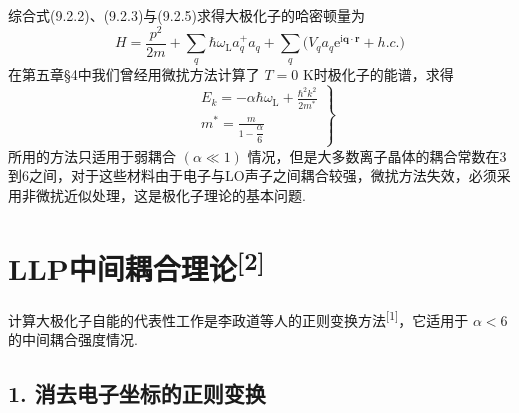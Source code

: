 综合式(9.2.2)、(9.2.3)与(9.2.5)求得大极化子的哈密顿量为
\begin{equation}
  H=\frac{p^{2}}{2m}+\sum_{q}\hbar\omega_{\mathrm L}a_{q}^{+}a_{q}
  +\sum_{q}\bigl(V_{q}a_{q}\mathrm{e}^{\mathrm{i}\boldsymbol{q}\cdot\boldsymbol{r}}+h.c.\bigr)
\end{equation}
在第五章§4中我们曾经用微扰方法计算了 $T=0$ K时极化子的能谱，求得
\begin{equation}
\left.
\begin{aligned}
  &E_{k}=-\alpha\hbar\omega_{\mathrm L}
  +\frac{\hbar^{2}k^{2}}{2m^{*}}\\
  &m^{*}=\frac{m}{1-\dfrac{\alpha}{6}}
\end{aligned}\right\}
\end{equation}
所用的方法只适用于弱耦合 $\left(\alpha\ll1\right)$ 情况，但是大多数离子晶体的耦合常数在3到6之间，对于这些材料由于电子与LO声子之间耦合较强，微扰方法失效，必须采用非微扰近似处理，这是极化子理论的基本问题.

\section{\texorpdfstring{LLP中间耦合理论\textsuperscript{[2]}}{LLP中间耦合理论[2]}}

计算大极化子自能的代表性工作是李政道等人的正则变换方法\textsuperscript{[1]}，它适用于 $\alpha<6$ 的中间耦合强度情况.

\subsection*{1. 消去电子坐标的正则变换}

